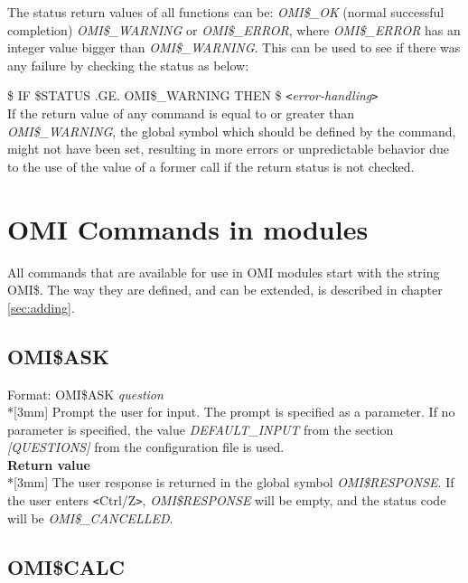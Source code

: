 \documentclass[a4paper]{book}
\newcommand{\lt}{\texttt{<}}
\newcommand{\gt}{\texttt{>}}
\renewcommand{\indent}{\hspace*{5mm}}
\begin{document}
The status return values of all functions can be:
\textsl{OMI{\$}{\_}OK} (normal successful completion)
\textsl{OMI{\$}{\_}WARNING} or \textsl{OMI{\$}{\_}ERROR}, where 
\textsl{OMI{\$}{\_}ERROR} has an integer value bigger than 
\textsl{OMI{\$}{\_}WARNING}. This can be used to see 
if there was any failure by checking the status as below:

\textsf{{\$} IF {\$}STATUS .GE. OMI{\$}{\_}WARNING THEN {\$} \lt \textit{error-handling}\gt} \\
If the return value of any command is equal to or greater than 
\textsl{OMI{\$}{\_}WARNING}, the global symbol which should be defined by the 
command, might not have been set, resulting in more errors or unpredictable 
behavior due to the use of the value of a former call if the return status 
is not checked.

\section{OMI Commands in modules}
\label{subsec:mylabel6}

All commands that are available for use in OMI modules start with the string 
OMI{\$}. The way they are defined, and can be extended, is described in 
chapter \ref{sec:adding}.

\subsection{OMI{\$}ASK}
\label{subsubsec:mylabel41}

\indent Format: \textsf{OMI{\$}ASK} \textit{question}\\*[3mm]
Prompt the user for input. The prompt is specified as a parameter. If no 
parameter is specified, the value \textsl{DEFAULT{\_}INPUT} from the section 
\textsl{[QUESTIONS]} from the configuration file is used.\\[3mm]
\textbf{Return value}\\*[3mm]
The user response is returned in the global symbol \textsl{OMI{\$}RESPONSE}. If the 
user enters \lt Ctrl/Z\gt, \textsl{OMI{\$}RESPONSE} will be empty, and the status code 
will be \textsl{OMI{\$}{\_}CANCELLED}.

\subsection{OMI{\$}CALC}
\label{subsubsec:mylabel42}
\end{document}
